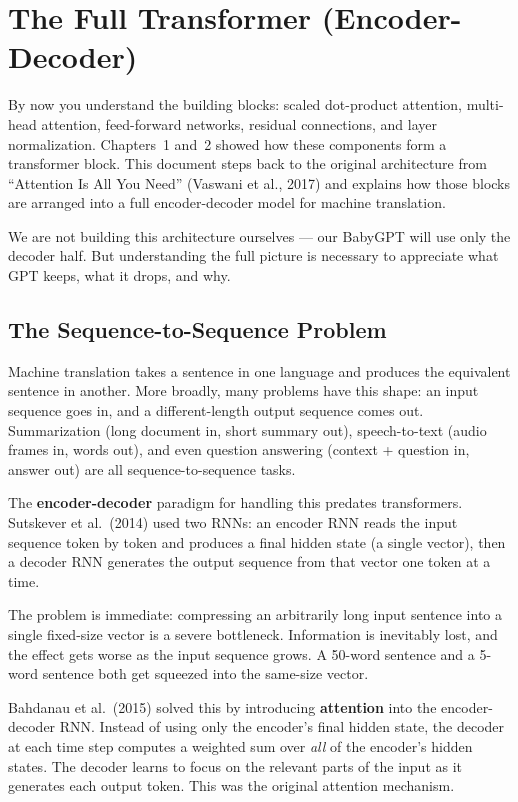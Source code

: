 \chapter{The Full Transformer (Encoder-Decoder)}

By now you understand the building blocks: scaled dot-product attention, multi-head attention, feed-forward networks, residual connections, and layer normalization. Chapters~1 and~2 showed how these components form a transformer block. This document steps back to the original architecture from ``Attention Is All You Need'' (Vaswani et al., 2017) and explains how those blocks are arranged into a full encoder-decoder model for machine translation.

We are not building this architecture ourselves --- our BabyGPT will use only the decoder half. But understanding the full picture is necessary to appreciate what GPT keeps, what it drops, and why.

\section{The Sequence-to-Sequence Problem}

Machine translation takes a sentence in one language and produces the equivalent sentence in another. More broadly, many problems have this shape: an input sequence goes in, and a different-length output sequence comes out. Summarization (long document in, short summary out), speech-to-text (audio frames in, words out), and even question answering (context + question in, answer out) are all sequence-to-sequence tasks.

The \textbf{encoder-decoder} paradigm for handling this predates transformers. Sutskever et al.\ (2014) used two RNNs: an encoder RNN reads the input sequence token by token and produces a final hidden state (a single vector), then a decoder RNN generates the output sequence from that vector one token at a time.

The problem is immediate: compressing an arbitrarily long input sentence into a single fixed-size vector is a severe bottleneck. Information is inevitably lost, and the effect gets worse as the input sequence grows. A 50-word sentence and a 5-word sentence both get squeezed into the same-size vector.

Bahdanau et al.\ (2015) solved this by introducing \textbf{attention} into the encoder-decoder RNN. Instead of using only the encoder's final hidden state, the decoder at each time step computes a weighted sum over \textit{all} of the encoder's hidden states. The decoder learns to focus on the relevant parts of the input as it generates each output token. This was the original attention mechanism.

